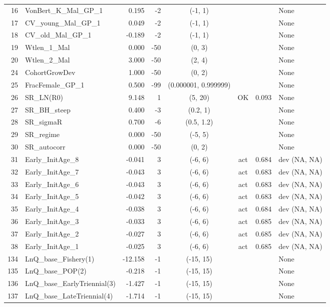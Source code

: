 \documentclass[12pt,]{article}
\begin{document}
\begin{landscape}
\begin{longtable}{rlrrcccl}
  16 & VonBert\_K\_Mal\_GP\_1 & 0.195 & -2 & (-1, 1) &  &  & None \\ 
  17 & CV\_young\_Mal\_GP\_1 & 0.049 & -2 & (-1, 1) &  &  & None \\ 
  18 & CV\_old\_Mal\_GP\_1 & -0.189 & -2 & (-1, 1) &  &  & None \\ 
  19 & Wtlen\_1\_Mal & 0.000 & -50 & (0, 3) &  &  & None \\ 
  20 & Wtlen\_2\_Mal & 3.000 & -50 & (2, 4) &  &  & None \\ 
  24 & CohortGrowDev & 1.000 & -50 & (0, 2) &  &  & None \\ 
  25 & FracFemale\_GP\_1 & 0.500 & -99 & (0.000001, 0.999999) &  &  & None \\ 
  26 & SR\_LN(R0) & 9.148 & 1 & (5, 20) & OK & 0.093 & None \\ 
  27 & SR\_BH\_steep & 0.400 & -3 & (0.2, 1) &  &  & None \\ 
  28 & SR\_sigmaR & 0.700 & -6 & (0.5, 1.2) &  &  & None \\ 
  29 & SR\_regime & 0.000 & -50 & (-5, 5) &  &  & None \\ 
  30 & SR\_autocorr & 0.000 & -50 & (0, 2) &  &  & None \\ 
  31 & Early\_InitAge\_8 & -0.041 & 3 & (-6, 6) & act & 0.684 & dev (NA, NA) \\ 
  32 & Early\_InitAge\_7 & -0.043 & 3 & (-6, 6) & act & 0.683 & dev (NA, NA) \\ 
  33 & Early\_InitAge\_6 & -0.043 & 3 & (-6, 6) & act & 0.683 & dev (NA, NA) \\ 
  34 & Early\_InitAge\_5 & -0.042 & 3 & (-6, 6) & act & 0.683 & dev (NA, NA) \\ 
  35 & Early\_InitAge\_4 & -0.038 & 3 & (-6, 6) & act & 0.684 & dev (NA, NA) \\ 
  36 & Early\_InitAge\_3 & -0.033 & 3 & (-6, 6) & act & 0.685 & dev (NA, NA) \\ 
  37 & Early\_InitAge\_2 & -0.027 & 3 & (-6, 6) & act & 0.685 & dev (NA, NA) \\ 
  38 & Early\_InitAge\_1 & -0.025 & 3 & (-6, 6) & act & 0.685 & dev (NA, NA) \\ 
  134 & LnQ\_base\_Fishery(1) & -12.158 & -1 & (-15, 15) &  &  & None \\ 
  135 & LnQ\_base\_POP(2) & -0.218 & -1 & (-15, 15) &  &  & None \\ 
  136 & LnQ\_base\_EarlyTriennial(3) & -1.427 & -1 & (-15, 15) &  &  & None \\ 
  137 & LnQ\_base\_LateTriennial(4) & -1.714 & -1 & (-15, 15) &  &  & None \\ 

\end{longtable}
\end{landscape}
\end{document}
